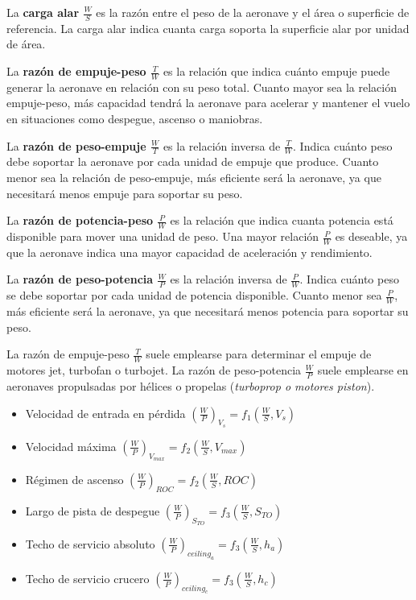 La \textbf{carga alar $\frac{W}{S}$} es la razón entre el peso de la aeronave y el área o superficie de referencia. La carga alar indica cuanta carga soporta la superficie alar por unidad de área. 

La \textbf{razón de empuje-peso $\frac{T}{W}$} es la relación que indica cuánto empuje puede generar la aeronave en relación con su peso total. 
Cuanto mayor sea la relación empuje-peso, más capacidad tendrá la aeronave para acelerar y mantener el vuelo en situaciones como despegue, ascenso o maniobras. 

La \textbf{razón de peso-empuje $\frac{W}{T}$} es la relación inversa de $\frac{T}{W}$. Indica cuánto peso debe soportar la aeronave por cada unidad de empuje que produce. Cuanto menor sea la relación de peso-empuje, más eficiente será la aeronave, ya que necesitará menos empuje para soportar su peso. 

La \textbf{razón de potencia-peso $\frac{P}{W}$} es la relación que indica cuanta potencia está disponible para mover una unidad de peso. Una mayor relación $\frac{P}{W}$ es deseable, ya que la aeronave indica una mayor capacidad de aceleración y rendimiento. 

La \textbf{razón de peso-potencia $\frac{W}{P}$} es la relación inversa de $\frac{P}{W}$. Indica cuánto peso se debe soportar por cada unidad de potencia disponible. Cuanto menor sea $\frac{P}{W}$, más eficiente será la aeronave, ya que necesitará menos potencia para soportar su peso. 


La razón de empuje-peso $\frac{T}{W}$ suele emplearse para determinar el empuje de motores jet,  turbofan o turbojet. 
La razón de peso-potencia $\frac{W}{P}$ suele emplearse en aeronaves propulsadas por hélices o propelas (\textit{turboprop o motores piston}).

\begin{itemize}
    \item Velocidad de entrada en pérdida $ (\frac{W}{P} )_{V_s} = f_1 (\frac{W}{S}, V_s)$
    \item Velocidad máxima $ (\frac{W}{P} )_{V_{max}} = f_2 (\frac{W}{S}, V_{max})$
    \item Régimen de ascenso  $ (\frac{W}{P} )_{ROC} = f_2 (\frac{W}{S}, ROC)$
    \item Largo de pista de despegue $ (\frac{W}{P} )_{S_{TO}} = f_3 (\frac{W}{S}, S_{TO})$
    \item Techo de servicio absoluto $ (\frac{W}{P} )_{ceiling_{a}} = f_3 (\frac{W}{S}, h_a)$
    \item Techo de servicio crucero $ (\frac{W}{P} )_{ceiling_{c}} = f_3 (\frac{W}{S}, h_c)$
\end{itemize}

